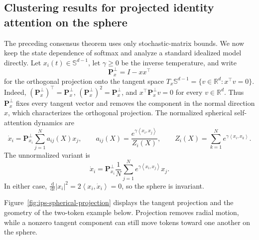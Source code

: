 \documentclass[11pt]{amsart}
\numberwithin{equation}{section}
\theoremstyle{plain}
\newcommand{\R}{\mathbb{R}}
\newcommand{\dd}{\,\mathrm{d}}
\newcommand{\abs}[1]{\left\lvert#1\right\rvert}
\newcommand{\ip}[2]{\left\langle#1,#2\right\rangle}
\begin{document}
\subsection{Clustering results for projected identity attention on the sphere}\label{sec:spherical-attention}
The preceding consensus theorem uses only stochastic-matrix bounds.  We
now keep the state dependence of softmax and analyze a standard idealized
model directly.  Let $x_i(t)\in\mathbb S^{d-1}$, let $\gamma\geq0$ be the
inverse temperature, and write
$$\mathbf P_x^\perp=I-xx^\top$$
for the orthogonal projection onto the tangent space
$T_x\mathbb S^{d-1}=\{v\in\R^d:x^\top v=0\}$.  Indeed,
$(\mathbf P_x^\perp)^\top=\mathbf P_x^\perp$,
$(\mathbf P_x^\perp)^2=\mathbf P_x^\perp$, and
$x^\top\mathbf P_x^\perp v=0$ for every $v\in\R^d$.  Thus
$\mathbf P_x^\perp$ fixes every tangent vector and removes the component in
the normal direction $x$, which characterizes the orthogonal projection.
The normalized spherical self-attention dynamics are
\begin{equation}\label{eq:spherical-sa}
 \dot x_i=\mathbf P_{x_i}^\perp\sum_{j=1}^Na_{ij}(X)x_j,
 \qquad
 a_{ij}(X)=\frac{e^{\gamma\ip{x_i}{x_j}}}{Z_i(X)},
 \qquad
 Z_i(X)=\sum_{k=1}^Ne^{\gamma\ip{x_i}{x_k}}.
\end{equation}
The unnormalized variant is
\begin{equation}\label{eq:spherical-usa}
 \dot x_i=\mathbf P_{x_i}^\perp\frac1N
 \sum_{j=1}^Ne^{\gamma\ip{x_i}{x_j}}x_j.
\end{equation}
In either case,
$\frac{\dd}{\dd t}\abs{x_i}^2=2\ip{x_i}{\dot x_i}=0$, so the sphere is
invariant.

Figure~\ref{fig:ips-spherical-projection} displays the tangent
projection and the geometry of the two-token example below.  Projection
removes radial motion, while a nonzero tangent component can still move tokens
toward one another on the sphere.
\end{document}
